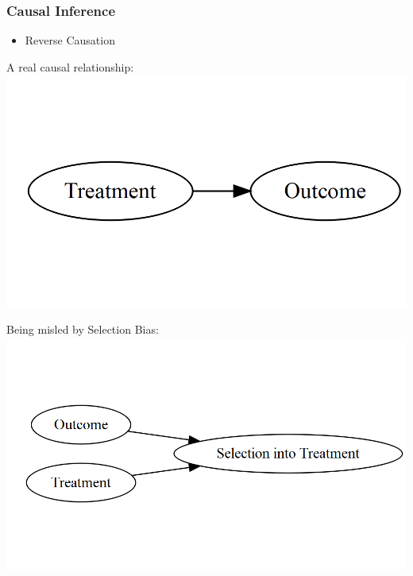 \documentclass[xcolor=x11names,compress]{beamer}\usepackage[]{graphicx}\usepackage[]{color}
\makeatletter
\def\maxwidth{ %
  \ifdim\Gin@nat@width>\linewidth
    \linewidth
  \else
    \Gin@nat@width
  \fi
}
\newenvironment{knitrout}{}{} %
\renewcommand{\(}{\begin{columns}}
\renewcommand{\)}{\end{columns}}
\newcommand{\<}[1]{\begin{column}{#1}}
\renewcommand{\>}{\end{column}}
\makeatother
\begin{document}
\begin{frame}
\frametitle{Causal Inference}
\begin{itemize}
\item Reverse Causation
\end{itemize}
\begin{multicols}{2}
A real causal relationship:
\begin{knitrout}
\color{fgcolor}
\includegraphics[width=\maxwidth]{figure/explanation7-1} 

\end{knitrout}
\columnbreak
Being misled by Selection Bias:
\begin{knitrout}
\color{fgcolor}
\includegraphics[width=\maxwidth]{figure/explanation8-1} 

\end{knitrout}
\end{multicols}
\end{frame}
\end{document}

